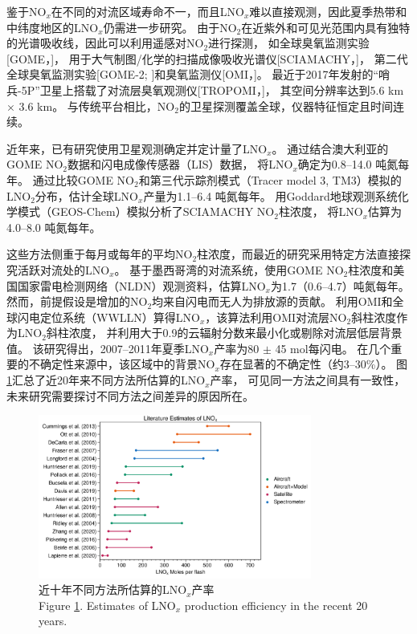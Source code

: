 鉴于NO$_x$在不同的对流区域寿命不一，而且LNO$_x$难以直接观测，因此夏季热带和中纬度地区的LNO$_x$仍需进一步研究。
由于NO$_2$在近紫外和可见光范围内具有独特的光谱吸收线，因此可以利用遥感对NO$_2$进行探测\citep{Platt.1983}，
如全球臭氧监测实验[GOME，\citet{Burrows.1999}]，
用于大气制图/化学的扫描成像吸收光谱仪[SCIAMACHY，\citet{Bovensmann.1999}]，
第二代全球臭氧监测实验[GOME-2; \citet{Callies.2000}]和臭氧监测仪[OMI，\citet{Levelt.2006}]。
最近于2017年发射的“哨兵-5P”卫星上搭载了对流层臭氧观测仪[TROPOMI，\citet{Veefkind.2012}]，
其空间分辨率达到5.6 km $\times$ 3.6 km。
与传统平台相比，NO$_2$的卫星探测覆盖全球，仪器特征恒定且时间连续。

近年来，已有研究使用卫星观测确定并定计量了LNO$_x$。
\citet{Beirle.2004}通过结合澳大利亚的GOME NO$_2$数据和闪电成像传感器（LIS）数据，
将LNO$_x$确定为0.8--14.0 吨氮每年。
\citet{Boersma.2005}通过比较GOME NO$_2$和第三代示踪剂模式（Tracer model 3, TM3）模拟的LNO$_2$分布，估计全球LNO$_x$产量为1.1--6.4 吨氮每年。
\citet{Martin.2007a}用Goddard地球观测系统化学模式（GEOS-Chem）模拟分析了SCIAMACHY NO$_2$柱浓度，
将LNO$_x$估算为4.0--8.0 吨氮每年。

这些方法侧重于每月或每年的平均NO$_2$柱浓度，而最近的研究采用特定方法直接探究活跃对流处的LNO$_x$。
\citet{Beirle.2006}基于墨西哥湾的对流系统，使用GOME NO$_2$柱浓度和美国国家雷电检测网络（NLDN）观测资料，估算LNO$_x$为1.7（0.6–4.7）吨氮每年。
然而，前提假设是增加的NO$_2$均来自闪电而无人为排放源的贡献。
\citet{Pickering.2016} 利用OMI和全球闪电定位系统（WWLLN）算得LNO$_x$，该算法利用OMI对流层NO$_2$斜柱浓度作为LNO$_2$斜柱浓度，
并利用大于0.9的云辐射分数来最小化或剔除对流层低层背景值。
该研究得出，2007--2011年夏季LNO$_x$产率为80 $\pm$ 45 mol每闪电。
在几个重要的不确定性来源中，该区域中的背景NO$_x$存在显著的不确定性（约3--30\%）。
图\ref{figure:lnox_production_xin}汇总了近20年来不同方法所估算的LNO$_x$产率，
可见同一方法之间具有一致性，未来研究需要探讨不同方法之间差异的原因所在。

\begin{figure}[H]
\centering
\includegraphics[width=0.8\textwidth]{./figures/lnox_production_xin.png}
\caption{近十年不同方法所估算的LNO$_x$产率\\
Figure \ref{figure:lnox_production_xin}. Estimates of LNO$_x$ production efficiency in the recent 20 years.}
\label{figure:lnox_production_xin}
\end{figure}

